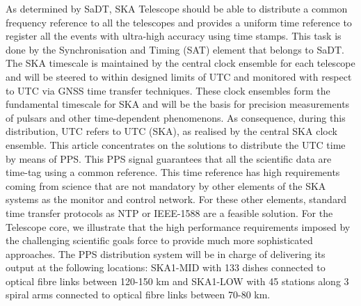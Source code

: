 As determined by SaDT, SKA Telescope should be able to distribute a common frequency reference to all the telescopes and provides a uniform time reference to register all the events with ultra-high accuracy using time stamps. This task is done by the Synchronisation and Timing (SAT) element that belongs to SaDT. The SKA timescale is maintained by the central clock ensemble for each telescope and will be steered to within designed limits of UTC and monitored with respect to UTC via GNSS time transfer techniques. These clock ensembles form the fundamental timescale for SKA and will be the basis for precision measurements of pulsars and other time-dependent phenomenons. As consequence, during this distribution, UTC refers to UTC (SKA), as realised by the central SKA clock ensemble.
This article concentrates on the solutions to distribute the UTC time by means of PPS. This PPS signal guarantees that all the scientific data are time-tag using a common reference. This time reference has high requirements coming from science that are not mandatory by other elements of the SKA systems as the monitor and control network. For these other elements, standard time transfer protocols as NTP or IEEE-1588 are a feasible solution. For the Telescope core, we illustrate that the high performance requirements imposed by the challenging scientific goals force to provide much more sophisticated approaches. 
The PPS distribution system will be in charge of delivering its output at the following locations: SKA1-MID with 133 dishes connected to optical fibre links between 120-150 km and SKA1-LOW with 45 stations along 3 spiral arms connected to optical fibre links between 70-80 km.

